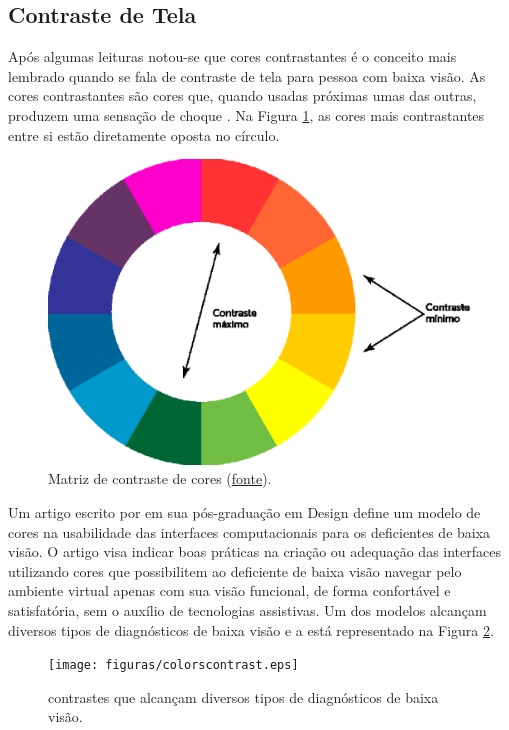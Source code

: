 \subsection{Contraste de Tela}\label{constrastsection}

Após algumas leituras notou-se que cores contrastantes é o conceito mais lembrado quando se fala de contraste de tela para pessoa com baixa visão. As cores contrastantes são cores que, quando usadas próximas umas das outras, produzem uma sensação de choque \cite{griffith}. Na Figura \ref{colors}, as cores mais contrastantes entre si estão diretamente oposta no círculo.

 \begin{figure}[ht]
	\centering
		\includegraphics[keepaspectratio=true,scale=0.5]{figuras/contrMatiz.eps}
	\caption{Matriz de contraste de cores (\href{http://ricardoartur.com.br/1001/2011/04/contraste-de-cores/}{fonte}).}
	\label{colors}
\end{figure}

Um artigo escrito por \cite{kulpa} em sua pós-graduação em Design define um modelo de cores na usabilidade das interfaces computacionais para os deficientes de baixa visão. O artigo visa indicar boas práticas na criação ou adequação das interfaces utilizando cores que possibilitem ao deficiente de baixa visão navegar pelo ambiente virtual apenas com sua visão funcional, de forma confortável e satisfatória, sem o auxílio de tecnologias assistivas. Um dos modelos alcançam diversos tipos de diagnósticos de baixa visão e a está representado na Figura \ref{colorscontrast}.

 \begin{figure}[ht]
	\centering
		\texttt{[image: figuras/colorscontrast.eps]}
	\caption{contrastes que alcançam diversos tipos de diagnósticos de baixa visão.}
	\label{colorscontrast}
\end{figure}

